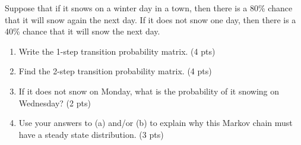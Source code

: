 


\item Suppose that if it snows on a winter day in a town, then there is a 80\% chance that it will snow again the next day. If it does not snow one day, then there is a 40\% chance that it will snow the next day. 


\begin{enumerate}

\item Write the 1-step transition probability matrix. (4 pts)

\ansfont{ 
\[ P = \begin{blockarray}{ccc}
& S & N  \\
\begin{block}{c(cc)}
S & 0.8 & 0.2  \\
N & 0.4 & 0.6  \\
\end{block}
\end{blockarray}
\]
}


\vfill

\item Find the 2-step transition probability matrix. (4 pts)

\ansfont{ 
\[P^{(2)}=P^2=
 \begin{blockarray}{ccc}
& S & N  \\
\begin{block}{c(cc)}
S & 0.72 & 0.28  \\
N & 0.56 & 0.44  \\
\end{block}
\end{blockarray}
\]
}

\vfill

\item If it does not snow on Monday, what is the probability of it snowing on Wednesday? (2 pts)
\vfill


\item Use your answers to (a) and/or (b) to explain why this Markov chain must have a steady state distribution. (3 pts)

\vfill


\end{enumerate}
